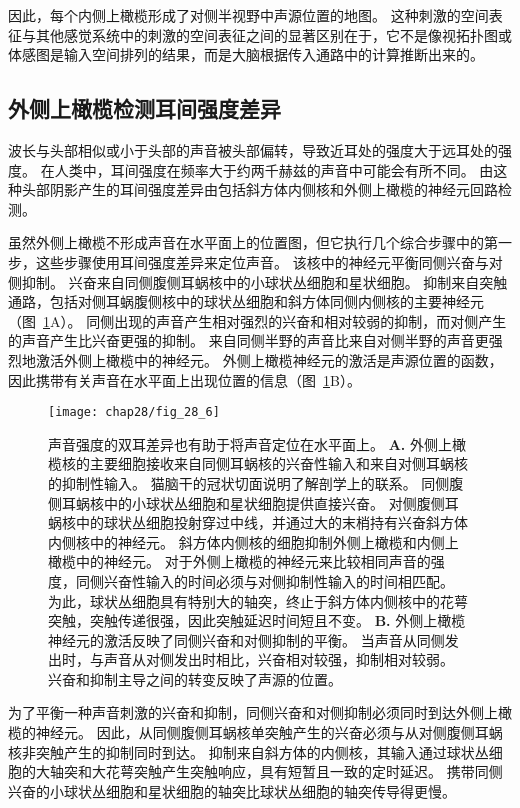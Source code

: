 因此，每个内侧上橄榄形成了对侧半视野中声源位置的地图。
这种刺激的空间表征与其他感觉系统中的刺激的空间表征之间的显著区别在于，它不是像视拓扑图或体感图是输入空间排列的结果，而是大脑根据传入通路中的计算推断出来的。



\subsection{外侧上橄榄检测耳间强度差异}

波长与头部相似或小于头部的声音被头部偏转，导致近耳处的强度大于远耳处的强度。
在人类中，耳间强度在频率大于约两千赫兹的声音中可能会有所不同。
由这种头部阴影产生的耳间强度差异由包括斜方体内侧核和外侧上橄榄的神经元回路检测。


虽然外侧上橄榄不形成声音在水平面上的位置图，但它执行几个综合步骤中的第一步，这些步骤使用耳间强度差异来定位声音。
该核中的神经元平衡同侧兴奋与对侧抑制。
兴奋来自同侧腹侧耳蜗核中的小球状丛细胞和星状细胞。
抑制来自突触通路，包括对侧耳蜗腹侧核中的球状丛细胞和斜方体同侧内侧核的主要神经元（图~\ref{fig:28_6}A）。
同侧出现的声音产生相对强烈的兴奋和相对较弱的抑制，而对侧产生的声音产生比兴奋更强的抑制。
来自同侧半野的声音比来自对侧半野的声音更强烈地激活外侧上橄榄中的神经元。
外侧上橄榄神经元的激活是声源位置的函数，因此携带有关声音在水平面上出现位置的信息（图~\ref{fig:28_6}B）。


\begin{figure}[htbp]
	\centering
	\texttt{[image: chap28/fig\_28\_6]}
	\caption{声音强度的双耳差异也有助于将声音定位在水平面上。
		\textbf{A.} 外侧上橄榄核的主要细胞接收来自同侧耳蜗核的兴奋性输入和来自对侧耳蜗核的抑制性输入。
		猫脑干的冠状切面说明了解剖学上的联系。
		同侧腹侧耳蜗核中的小球状丛细胞和星状细胞提供直接兴奋。 
		对侧腹侧耳蜗核中的球状丛细胞投射穿过中线，并通过大的末梢持有兴奋斜方体内侧核中的神经元。
		斜方体内侧核的细胞抑制外侧上橄榄和内侧上橄榄中的神经元。
		对于外侧上橄榄的神经元来比较相同声音的强度，同侧兴奋性输入的时间必须与对侧抑制性输入的时间相匹配。
		为此，球状丛细胞具有特别大的轴突，终止于斜方体内侧核中的花萼突触，突触传递很强，因此突触延迟时间短且不变。
		\textbf{B.} 外侧上橄榄神经元的激活反映了同侧兴奋和对侧抑制的平衡。
		当声音从同侧发出时，与声音从对侧发出时相比，兴奋相对较强，抑制相对较弱。
		兴奋和抑制主导之间的转变反映了声源的位置。}
	\label{fig:28_6}
\end{figure}


为了平衡一种声音刺激的兴奋和抑制，同侧兴奋和对侧抑制必须同时到达外侧上橄榄的神经元。
因此，从同侧腹侧耳蜗核单突触产生的兴奋必须与从对侧腹侧耳蜗核非突触产生的抑制同时到达。
抑制来自斜方体的内侧核，其输入通过球状丛细胞的大轴突和大花萼突触产生突触响应，具有短暂且一致的定时延迟。
携带同侧兴奋的小球状丛细胞和星状细胞的轴突比球状丛细胞的轴突传导得更慢。


